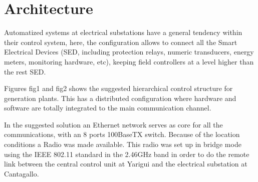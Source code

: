 
\section{Architecture}

Automatized systems at electrical substations have a general tendency
within their control system, here, the configuration allows to connect
all the Smart Electrical Devices (SED, including protection relays, numeric
transducers, energy meters, monitoring hardware, etc), keeping field controllers
at a level higher than the rest SED.



Figures fig1 and fig2 shows the suggested hierarchical control structure
for generation plants. This has a distributed configuration where hardware
and software are totally integrated to the main communication channel.


In the suggested solution an Ethernet network serves as core for all the
communications, with an 8 ports 100BaseTX switch. Because of the location
conditions a Radio was made available. This radio was set up in bridge mode
using the IEEE 802.11 standard in the 2.46GHz band in order to do the remote
link between the central control unit at Yarigui and the electrical substation
at Cantagallo.


